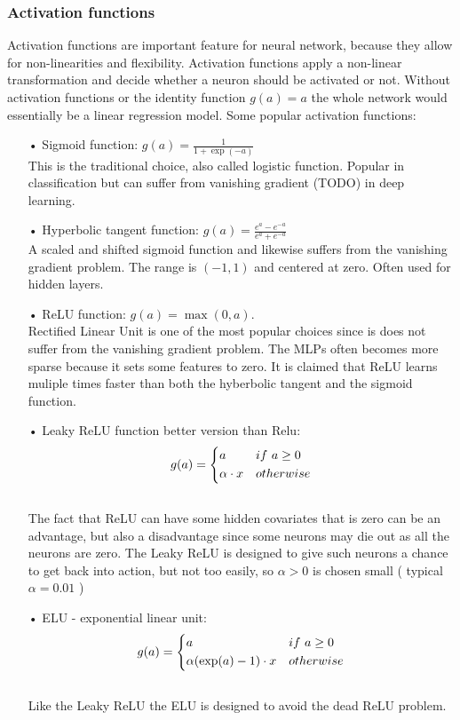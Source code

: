 \subsubsection{Activation functions}
Activation functions are important feature for neural network, because they allow for non-linearities and flexibility. Activation functions apply a non-linear transformation and decide whether a neuron should be activated or not. Without activation functions or the identity function $g(a)=a$ the whole network would essentially be a linear regression model. Some popular activation functions:
\begin{enumerate}
\item[•] Sigmoid function: $g(a)=\frac{1}{1+\exp(-a)}$\\
This is the traditional choice, also called logistic function. Popular in classification but can suffer from vanishing gradient (TODO) in deep learning.
\item[•] Hyperbolic tangent function: $g(a)=\frac{e^a-e^{-a}}{e^a+e^{-a}}$\\
A scaled and shifted sigmoid function and likewise suffers from the vanishing gradient problem. The range is $(-1,1)$ and centered at zero. Often used for hidden layers.
\item[•] ReLU function: $g(a)=\max(0,a)$.\\
Rectified Linear Unit is one of the most popular choices since is does not suffer from the vanishing gradient problem. The MLPs often becomes more sparse because it sets some features to zero. It is claimed that ReLU learns muliple times faster than both the hyberbolic tangent and the sigmoid function.
\item[•] Leaky ReLU function better version than Relu:  \[ g(a)=
    \begin{dcases}
        a & if \ a \geq 0 \\
        \alpha \cdot x & otherwise \\
    \end{dcases}
\]\\
The fact that ReLU can have some hidden covariates that is zero can be an advantage, but also a disadvantage since some neurons may die out as all the neurons are zero. The Leaky ReLU is designed to give such neurons a chance to get back into action, but not too easily, so $\alpha>0$ is chosen small ( typical $\alpha=0.01$ ) 

\item[•] ELU - exponential linear unit:  \[ g(a)=
    \begin{dcases}
        a & if \ a \geq 0 \\
        \alpha(\exp(a)-1) \cdot x & otherwise \\
    \end{dcases}
\]\\
Like the Leaky ReLU the ELU is designed to avoid the dead ReLU problem. 
\end{enumerate}

